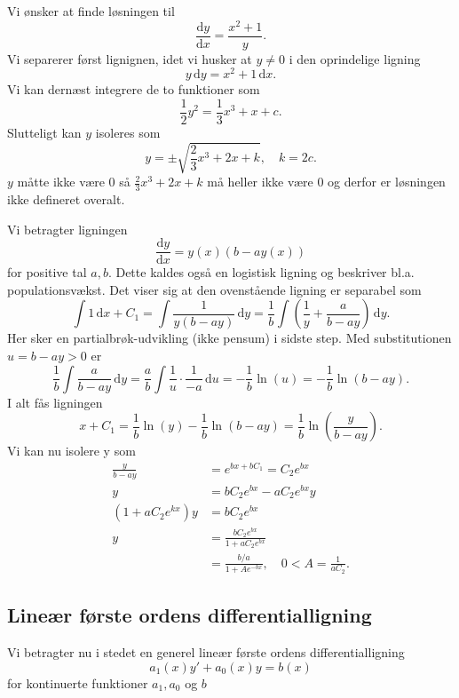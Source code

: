\begin{eks} 
  Vi ønsker at finde løsningen til
  \[ 
  \frac{\mathrm{d}y}{\mathrm{d}x} = \frac{x^2 + 1}{y}
  .\]
  \bigbreak
  Vi separerer først lignignen, idet vi husker at $y \neq 0$ i den oprindelige ligning
  \[ 
  y \, \mathrm{d}y = x^2 + 1 \, \mathrm{d}x 
  .\]
  Vi kan dernæst integrere de to funktioner som
  \[ 
  \frac{1}{2} y^2 = \frac{1}{3}x^3 + x + c
  .\]
  Slutteligt kan $y$ isoleres som
  \[ 
    y = \pm \sqrt{\frac{2}{3}x^3 + 2x + k}, \quad k = 2c
  .\]
  $y$ måtte ikke være 0 så $\frac{2}{3}x^3 + 2x + k$ må heller ikke være 0 og derfor er løsningen ikke defineret overalt.
\end{eks}

\begin{eks} 
  Vi betragter ligningen
  \[ 
  \frac{\mathrm{d}y}{\mathrm{d}x} = y(x)(b-ay(x))
  \]
  for positive tal $a, b$. Dette kaldes også en logistisk ligning og beskriver bl.a. populationsvækst. 
  \bigbreak
  Det viser sig at den ovenstående ligning er separabel som
  \[ 
  \int 1 \, \mathrm{d}x + C_1 = \int \frac{1}{y(b-ay)} \, \mathrm{d}y = \frac{1}{b} \int \left(\frac{1}{y} + \frac{a}{b-ay} \right) \, \mathrm{d}y
  .\]
  Her sker en partialbrøk-udvikling (ikke pensum) i sidste step. Med substitutionen $u = b-ay > 0$ er
  \[ 
  \frac{1}{b} \int \frac{a}{b-ay} \, \mathrm{d}y = \frac{a}{b} \int \frac{1}{u} \cdot \frac{1}{-a} \, \mathrm{d}u = -\frac{1}{b} \ln(u) = -\frac{1}{b}\ln(b-ay)
  .\]
  I alt fås ligningen 
  \[ 
  x + C_1 = \frac{1}{b} \ln(y) - \frac{1}{b} \ln(b-ay) = \frac{1}{b}\ln \left( \frac{y}{b-ay} \right)
  .\]
  Vi kan nu isolere y som
  \begin{align*}
    \frac{y}{b-ay} &= e^{bx + bC_1} = C_2 e^{bx} \\
    y &= bC_2e^{bx} - aC_2e^{bx}y \\
    \left( 1 + aC_2e^{kx} \right)y &= bC_2 e^{bx} \\
    y &= \frac{bC_2 e^{bx}}{1 + aC_2 e^{bx}} \\
    &= \frac{b / a}{1 + A e^{-bx}}, \quad 0 < A = \frac{1}{aC_2}
  .\end{align*}
\end{eks}

\subsection{Lineær første ordens differentialligning}
Vi betragter nu i stedet en generel lineær første ordens differentialligning
\[ 
a_1(x)y' + a_0(x)y = b(x)
\]
for kontinuerte funktioner $a_1, a_0$ og $b$

